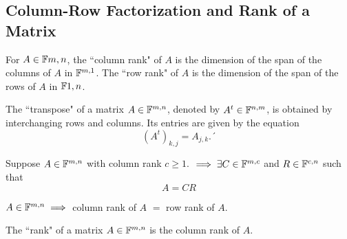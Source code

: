 \subsection{Column-Row Factorization and Rank of a Matrix}

\setcounter{thm}{51}
\begin{mydef}
  For $A \in \mathbb{F}{m,n}$, the ``column rank" of $A$ is the dimension of the span of the columns of $A$ in $\mathbb{F}^{m,1}$. The ``row rank" of $A$ is the dimension of the span of the rows of $A$ in $\mathbb{F}{1,n}$.
\end{mydef}

\setcounter{thm}{53}
\begin{mydef}
  The ``transpose" of a matrix $A\in \mathbb{F}^{m,n}$, denoted by $A^t\in \mathbb{F}^{n,m}$, is obtained by interchanging rows and columns. Its entries are given by the equation
  \begin{equation}
    \left(A^t\right)_{k,j} = A_{j,k}.´
  \end{equation}
\end{mydef}

\setcounter{thm}{55}
\begin{thm}
  Suppose $A \in \mathbb{F}^{m,n}$ with column rank $c \geq 1.$ $\implies \exists C\in \mathbb{F}^{m,c}$ and $R\in \mathbb{F}^{c,n}$ such that
  \begin{equation}
    A = CR
  \end{equation}
\end{thm}

\begin{thm}
  $A\in \mathbb{F}^{m,n} \implies$ column rank of $A$ $=$ row rank of $A$.
\end{thm}

\begin{mydef} [rank]
  The ``rank" of a matrix $A \in  \mathbb{F}^{m,n}$ is the column rank of $A$.
\end{mydef}
